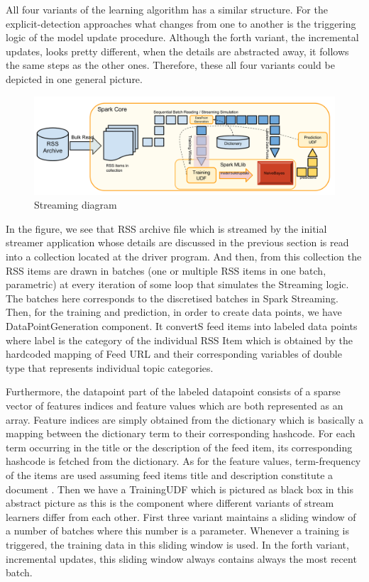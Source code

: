 \documentclass{article} %
\begin{document}
All four variants of the learning algorithm has a similar structure. For the explicit-detection approaches what changes from one to another is the triggering logic of the model update procedure. Although the forth variant, the incremental updates, looks pretty different, when the details are abstracted away, it follows the same steps as the other ones. Therefore, these all four variants could be depicted in one general picture.
\begin{figure}[htbp]
  \centering
  \includegraphics[scale=0.24]{./figures/streaming_diagram.png}
  \caption{Streaming diagram}
\end{figure}

In the figure, we see that RSS archive file which is streamed by the initial streamer application whose details are discussed in the previous section is read into a collection located at the driver program. And then, from this collection the RSS items are drawn in batches (one or multiple RSS items in one batch, parametric) at every iteration of some loop that simulates the Streaming logic.
The batches here corresponds to the discretised batches in Spark Streaming. Then, for the training and prediction, in order to create data points, we have DataPointGeneration component. It convertS feed items into labeled data points where label is the category of the individual RSS Item which is obtained by the hardcoded mapping of Feed URL and their corresponding variables of double type that represents individual topic categories. 

Furthermore, the datapoint part of the labeled datapoint consists of a sparse vector of features indices and feature values which are both represented as an array. Feature indices are simply obtained from the dictionary which is basically a mapping between the dictionary term to their corresponding hashcode. For each term occurring in the title or the description of the feed item, its corresponding hashcode is fetched from the dictionary. As for the feature values, term-frequency of the items are used assuming feed items title and description constitute a document . Then we have a TrainingUDF which is pictured as black box in this abstract picture as this is the component where different variants of stream learners differ from each other. First three variant maintains a sliding window of a number of batches where this number is a parameter. Whenever a training is triggered, the training data in this sliding window is used. In the forth variant, incremental updates, this sliding window always contains always the most recent batch. 
\end{document}
